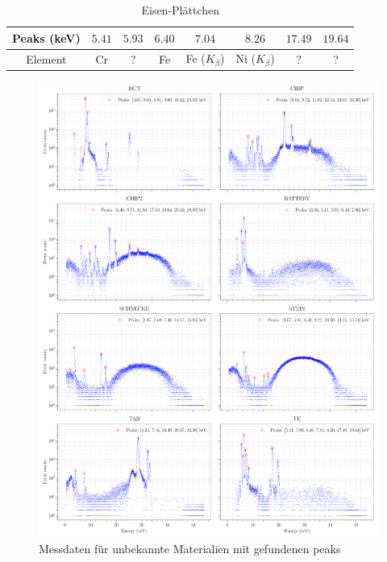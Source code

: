 \documentclass[a4paper,14pt]{article}
\begin{document}
\begin{table}[H]
	\renewcommand{\arraystretch}{1}
	\centering
	\Large
	\begin{adjustbox}{width=\textwidth}
		\begin{tabular}{|c|c|c|c|c|c|c|c|}
			\hline
			Peaks (keV) & $5.41$ & $5.93$ & $6.40$ & $7.04$ & $8.26$ & $17.49$ & $19.64$ \\
			\hline
			Element & Cr & ? & Fe & Fe ($K_\beta$) & Ni ($K_\beta$) & ? & ? \\
			\hline
		\end{tabular}
	\end{adjustbox}
	\caption{ Eisen-Pl\"attchen }
	\label{tab: }
\end{table}

\begin{figure}[H]
\centering
\includegraphics[width=\textwidth]{../Figures/XRay-analysis.pdf}
\caption{Messdaten für unbekannte Materialien mit gefundenen peaks}
\label{XRay_analysis}
\end{figure}
\end{document}
